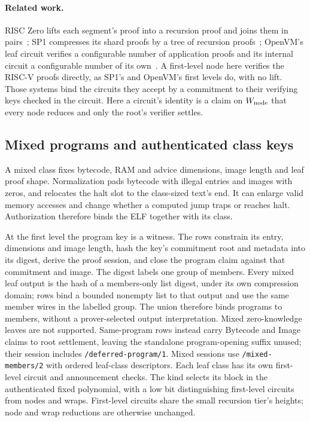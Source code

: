 \paragraph{Related work.} RISC Zero lifts each segment's proof into a recursion proof and joins them in pairs~\cite{BG23}; SP1 compresses its shard proofs by a tree of recursion proofs~\cite{SP1}; OpenVM's leaf circuit verifies a configurable number of application proofs and its internal circuit a configurable number of its own~\cite{OpenVM}. A first-level node here verifies the RISC-V proofs directly, as SP1's and OpenVM's first levels do, with no lift. Those systems bind the circuits they accept by a commitment to their verifying keys checked in the circuit. Here a circuit's identity is a claim on $W_{\mathrm{node}}$ that every node reduces and only the root's verifier settles.

\subsection{Mixed programs and authenticated class keys}

A mixed class fixes bytecode, RAM and advice dimensions, image length and leaf proof shape. Normalization pads bytecode with illegal entries and images with zeros, and relocates the halt slot to the class-sized text's end. It can enlarge valid memory accesses and change whether a computed jump traps or reaches halt. Authorization therefore binds the ELF together with its class.

At the first level the program key is a witness. The rows constrain its entry, dimensions and image length, hash the key's commitment root and metadata into its digest, derive the proof session, and close the program claim against that commitment and image. The digest labels one group of members. Every mixed leaf output is the hash of a members-only list digest, under its own compression domain; rows bind a bounded nonempty list to that output and use the same member wires in the labelled group. The union therefore binds programs to members, without a prover-selected output interpretation. Mixed zero-knowledge leaves are not supported. Same-program rows instead carry Bytecode and Image claims to root settlement, leaving the standalone program-opening suffix unused; their session includes \texttt{/deferred-program/1}. Mixed sessions use \texttt{/mixed-members/2} with ordered leaf-class descriptors. Each leaf class has its own first-level circuit and announcement checks. The kind selects its block in the authenticated fixed polynomial, with a low bit distinguishing first-level circuits from nodes and wraps. First-level circuits share the small recursion tier's heights; node and wrap reductions are otherwise unchanged.

